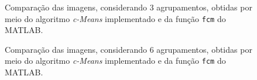 \documentclass[12pt,a4paper]{article}
\numberwithin{equation}{section}
\begin{document}
\begin{figure}[!htbp]
	\centering
	\caption{Comparação das imagens, considerando 3 agrupamentos, obtidas por meio do algoritmo \textit{c-Means} implementado e da função \texttt{fcm} do MATLAB.}
	\label{fig:img_02_seg}
\end{figure}

\begin{figure}[!htbp]
	\centering
	\caption{Comparação das imagens, considerando 6 agrupamentos, obtidas por meio do algoritmo \textit{c-Means} implementado e da função \texttt{fcm} do MATLAB.}
	\label{fig:img_03_seg}
\end{figure}
\end{document}
